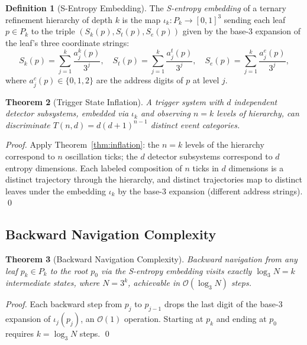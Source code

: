 \documentclass[twocolumn,10pt,a4paper]{article}
\theoremstyle{thmstyle}
\newtheorem{theorem}{Theorem}[section]
\theoremstyle{definition}
\newtheorem{definition}[theorem]{Definition}
\theoremstyle{remark}
\newcommand{\Sk}{S_{k}}
\newcommand{\St}{S_{t}}
\newcommand{\Se}{S_{e}}
\begin{document}
\begin{definition}[S-Entropy Embedding]
\label{def:s-embed}
The \emph{S-entropy embedding} of a ternary refinement hierarchy of
depth $k$ is the map $\iota_k\colon P_k \to [0,1]^3$ sending each
leaf $p \in P_k$ to the triple $(\Sk(p), \St(p), \Se(p))$ given by
the base-3 expansion of the leaf's three coordinate strings:
\[
\Sk(p) = \sum_{j=1}^{k}\frac{a_j^k(p)}{3^j},\quad
\St(p) = \sum_{j=1}^{k}\frac{a_j^t(p)}{3^j},\quad
\Se(p) = \sum_{j=1}^{k}\frac{a_j^e(p)}{3^j},
\]
where $a_j^c(p) \in \{0,1,2\}$ are the address digits of $p$ at level $j$.
\end{definition}

\begin{theorem}[Trigger State Inflation]
\label{thm:trigger-inflation}
A trigger system with $d$ independent detector subsystems, embedded
via $\iota_k$ and observing $n = k$ levels of hierarchy, can
discriminate $T(n,d) = d(d+1)^{n-1}$ distinct event categories.
\end{theorem}

\begin{proof}
Apply Theorem~\ref{thm:inflation}: the $n = k$ levels of the
hierarchy correspond to $n$ oscillation ticks; the $d$ detector
subsystems correspond to $d$ entropy dimensions. Each labeled
composition of $n$ ticks in $d$ dimensions is a distinct trajectory
through the hierarchy, and distinct trajectories map to distinct
leaves under the embedding $\iota_k$ by the base-3 expansion
(different address strings). \qed
\end{proof}

\subsection{Backward Navigation Complexity}

\begin{theorem}[Backward Navigation Complexity]
\label{thm:backward-complexity}
Backward navigation from any leaf $p_k \in P_k$ to the root $p_0$
via the S-entropy embedding visits exactly $\log_3 N = k$ intermediate
states, where $N = 3^k$, achievable in $\mathcal{O}(\log_3 N)$ steps.
\end{theorem}

\begin{proof}
Each backward step from $p_j$ to $p_{j-1}$ drops the last digit of
the base-3 expansion of $\iota_j(p_j)$, an $\mathcal{O}(1)$ operation.
Starting at $p_k$ and ending at $p_0$ requires $k = \log_3 N$ steps.
\qed
\end{proof}
\end{document}
